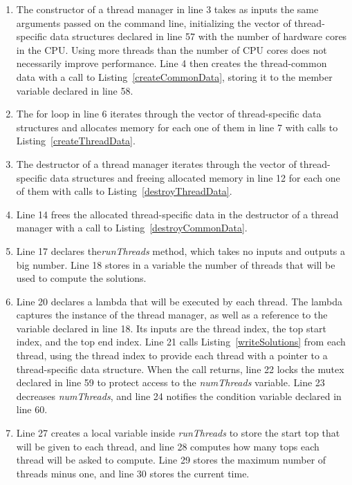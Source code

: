\begin{enumerate}
\addtocounter{enumi}{2}
\item The constructor of a thread manager in line 3 takes as inputs the same arguments passed on the command line, initializing the vector of thread-specific data structures declared in line 57 with the number of hardware cores in the CPU. Using more threads than the number of CPU cores does not necessarily improve performance. Line 4 then creates the thread-common data with a call to Listing~\ref{createCommonData}, storing it to the member variable declared in line 58.
\addtocounter{enumi}{2}
\item The for loop in line 6 iterates through the vector of thread-specific data structures and allocates memory for each one of them in line 7 with calls to Listing~\ref{createThreadData}.
\addtocounter{enumi}{4}
\item The destructor of a thread manager iterates through the vector of thread-specific data structures and freeing allocated memory in line 12 for each one of them with calls to Listing~\ref{destroyThreadData}.
\addtocounter{enumi}{2}
\item Line 14 frees the allocated thread-specific data in the destructor of a thread manager with a call to Listing~\ref{destroyCommonData}.
\addtocounter{enumi}{2}
\item Line 17 declares the\emph{runThreads} method, which takes no inputs and outputs a big number. Line 18 stores in a variable the number of threads that will be used to compute the solutions.
\addtocounter{enumi}{2}
\item Line 20 declares a lambda that will be executed by each thread. The lambda captures the instance of the thread manager, as well as a reference to the variable declared in line 18. Its inputs are the thread index, the top start index, and the top end index. Line 21 calls Listing~\ref{writeSolutions} from each thread, using the thread index to provide each thread with a pointer to a thread-specific data structure. When the call returns, line 22 locks the mutex declared in line 59 to protect access to the \emph{numThreads} variable. Line 23 decreases \emph{numThreads}, and line 24 notifies the condition variable declared in line 60.
\addtocounter{enumi}{6}
\item Line 27 creates a local variable inside \emph{runThreads} to store the start top that will be given to each thread, and line 28 computes how many tops each thread will be asked to compute. Line 29 stores the maximum number of threads minus one, and line 30 stores the current time.

\end{enumerate}
